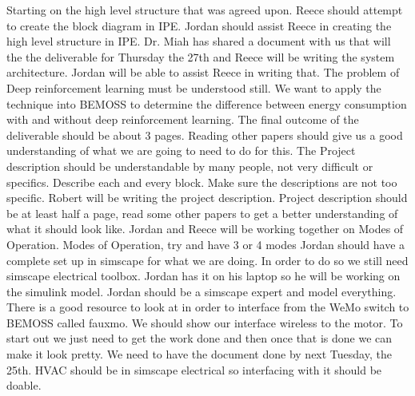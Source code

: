 \documentclass[fontsize=11pt, %
                             paper=letter, %
                             twoside, %
                             captions=tableheading,
                             index=totoc,
                             hyperref]{labbook}
\begin{document}
Starting on the high level structure that was agreed upon. Reece should attempt to create the block diagram in IPE. Jordan should assist Reece in creating the high level structure in IPE.
 \newline 
 \newline
 Dr. Miah has shared a document with us that will the the deliverable for Thursday the 27th and Reece will be writing the system architecture. Jordan will be able to assist Reece in writing that.
 \newline
 \newline
 The problem of Deep reinforcement learning must be understood still. We want to apply the technique into BEMOSS to determine the difference between energy consumption with and without deep reinforcement learning. The final outcome of the deliverable should be about 3 pages. Reading other papers should give us a good understanding of what we are going to need to do for this. The Project description should be understandable by many people, not very difficult or specifics. Describe each and every block. Make sure the descriptions are not too specific. 
 \newline
  Robert will be writing the project description. Project description should be at least half a page, read some other papers to get a better understanding of what it should look like.
 \newline
 Jordan and Reece will be working together on Modes of Operation. Modes of Operation, try and have 3 or 4 modes 
 \newline
 \newline
 Jordan should have a complete set up in simscape for what we are doing. In order to do so we still need simscape electrical toolbox. Jordan has it on his laptop so he will be working on the simulink model. Jordan should be a simscape expert and model everything.
 \newline
 \newline
 There is a good resource to look at in order to interface from the WeMo switch to BEMOSS called fauxmo.
 \newline
 \newline
 We should show our interface wireless to the motor. To start out we just need to get the work done and then once that is done we can make it look pretty.
 We need to have the document done by next Tuesday, the 25th. HVAC should be in simscape electrical so interfacing with it should be doable.
 
 
 
\end{document}
